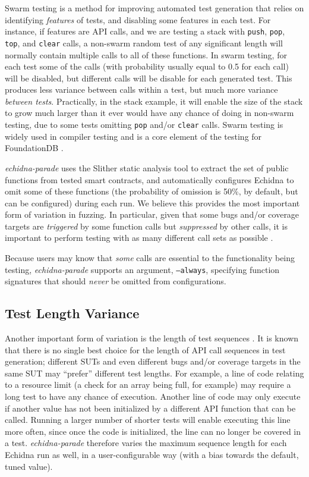 \documentclass[sigconf]{acmart}
\begin{document}
{Swarm testing \cite{ISSTA12} is a method for improving automated test
generation that relies on identifying \emph{features} of tests, and
disabling some features in each test.  For instance, if features are
API calls, and we are testing a stack with {\tt push}, {\tt pop}, {\tt
  top}, and {\tt clear} calls, a non-swarm random test of any
significant length will normally contain multiple calls to all of
these functions.  In swarm testing, for each test some of the calls
(with probability usually equal to 0.5 for each call) will be
disabled, but different calls will be disable for each generated
test.  This produces less variance between calls within a test, but
much more variance \emph{between tests}.  Practically, in the stack
example, it will enable the size of the stack to grow much larger than
it ever would have any chance of doing in non-swarm testing, due to
some tests omitting {\tt pop} and/or {\tt clear} calls.  Swarm testing
is widely used in compiler testing
\cite{le2014compiler} and is a core element of the
testing for FoundationDB \cite{zhou2021foundationdb}.

\emph{echidna-parade} uses the Slither static analysis tool to extract
the set of public functions from tested smart contracts, and
automatically configures Echidna to omit some of these functions
(the probability of omission is 50\%, by default, but can be configured)
during each run.  We believe this provides the most important form of variation
in fuzzing.  In particular, given that some bugs and/or coverage
targets are \emph{triggered} by some function calls but
\emph{suppressed} by other calls, it is important to perform testing
with as many different call sets as possible \cite{groce2013help}.

Because users may know that \emph{some} calls are essential to the functionality being testing, \emph{echidna-parade} supports an argument, {\tt --always}, specifying function signatures that should \emph{never} be omitted from configurations.

\subsection{Test Length Variance}

Another important form of variation is the length of test sequences \cite{ASE08,ArcuriLen}.  It is
known that there is no single best choice for the length of API call
sequences in test generation; different SUTs and even different bugs
and/or coverage targets in the same SUT may ``prefer'' different test
lengths.  For example, a line of code relating to a resource limit (a
check for an array being full, for example) may require a long test to
have any chance of execution.  Another line of code may only execute
if another value has not been initialized by a different API function
that can be called.  Running a larger number of shorter tests will enable executing
this line more often, since once the code is initialized, the line can
no longer be covered in a test.  \emph{echidna-parade} therefore
varies the maximum sequence length for each Echidna run as well, in a
user-configurable way (with a bias towards the default, tuned value).

}
\end{document}
